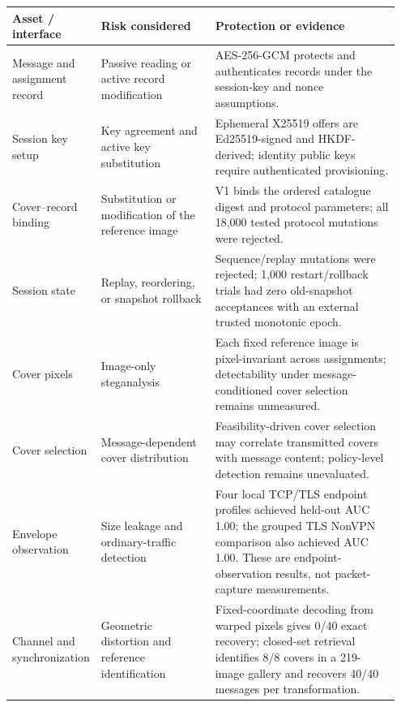 \begin{tabular}{p{0.16\linewidth}p{0.30\linewidth}p{0.49\linewidth}}
\toprule
\textbf{Asset / interface} & \textbf{Risk considered} & \textbf{Protection or evidence} \\
\midrule
Message and assignment record & Passive reading or active record modification & AES-256-GCM protects and authenticates records under the session-key and nonce assumptions. \\
Session key setup & Key agreement and active key substitution & Ephemeral X25519 offers are Ed25519-signed and HKDF-derived; identity public keys require authenticated provisioning. \\
Cover--record binding & Substitution or modification of the reference image & V1 binds the ordered catalogue digest and protocol parameters; all 18,000 tested protocol mutations were rejected. \\
Session state & Replay, reordering, or snapshot rollback & Sequence/replay mutations were rejected; 1,000 restart/rollback trials had zero old-snapshot acceptances with an external trusted monotonic epoch. \\
Cover pixels & Image-only steganalysis & Each fixed reference image is pixel-invariant across assignments; detectability under message-conditioned cover selection remains unmeasured. \\
Cover selection & Message-dependent cover distribution & Feasibility-driven cover selection may correlate transmitted covers with message content; policy-level detection remains unevaluated. \\
Envelope observation & Size leakage and ordinary-traffic detection & Four local TCP/TLS endpoint profiles achieved held-out AUC 1.00; the grouped TLS NonVPN comparison also achieved AUC 1.00. These are endpoint-observation results, not packet-capture measurements. \\
Channel and synchronization & Geometric distortion and reference identification & Fixed-coordinate decoding from warped pixels gives 0/40 exact recovery; closed-set retrieval identifies 8/8 covers in a 219-image gallery and recovers 40/40 messages per transformation. \\
\bottomrule
\end{tabular}
